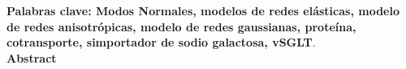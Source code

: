 \textbf{\small Palabras clave: Modos Normales, modelos de redes el\'{a}sticas, modelo de redes anisotr\'{o}picas, modelo de redes gaussianas, prote\'{i}na, cotransporte, simportador de sodio galactosa, vSGLT}.\\[2.0cm]
\textbf{\LARGE Abstract}\\\\


